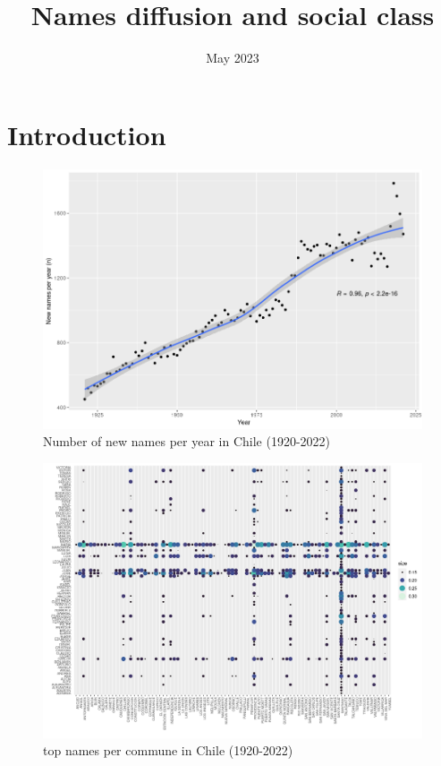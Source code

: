 \documentclass{article}
\title{Names diffusion and social class}
\author{}
\date{May 2023}
\begin{document}
\maketitle

\section{Introduction}


\begin{figure}[H]
    \centering
    \includegraphics[width=13cm]{plot/new_names_year.png}
    \caption{Number of new names per year in Chile (1920-2022)}
    \label{}
\end{figure}


\begin{figure}[H]
    \centering
    \includegraphics[width=13cm]{plot/name_commune.png}
    \caption{top names per commune in Chile (1920-2022)}
    \label{}
\end{figure}
\end{document}
